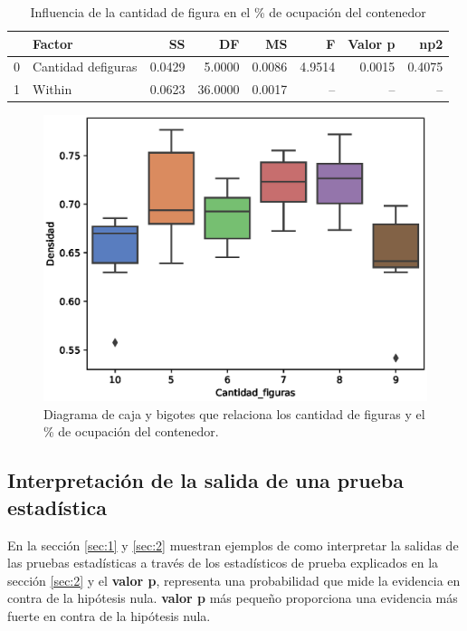 \documentclass{article}
\begin{document}
\begin{table}
  \centering
  \caption{Influencia de la cantidad de figura en el \% de ocupación del contenedor}
    \begin{tabular}{clrrrrrr}
    \toprule
          & \textbf{Factor} & \textbf{SS} & \textbf{DF} & \textbf{MS} & \textbf{F} & \textbf{Valor p} & \textbf{np2} \\
    \midrule
    0     & Cantidad defiguras & 0.0429 & 5.0000 & 0.0086 & 4.9514 & 0.0015 & 0.4075 \\
    1     & Within & 0.0623 & 36.0000 & 0.0017 & -- & -- & -- \\
    \bottomrule
    \end{tabular}%
  \label{tab:2}%
\end{table}%
\begin{figure}
    \centering
    \includegraphics[scale=0.8]{figuras/boxplot_Cantidad_figuras.eps}
    \caption{Diagrama de caja y bigotes que relaciona los cantidad de figuras y el \% de ocupación del contenedor.}
    \label{fig:2}
\end{figure}

\subsection{Interpretación de la salida de una prueba estadística}
\label{sec:3}
 En la sección \ref{sec:1} y \ref{sec:2}  muestran ejemplos de como interpretar la salidas de las pruebas estadísticas a través de los estadísticos de prueba explicados en la sección \ref{sec:2} y el \textbf{valor p}, representa una probabilidad que mide la evidencia en contra de la hipótesis nula. \textbf{valor p} más pequeño proporciona una evidencia más fuerte en contra de la hipótesis nula.
 
\end{document}
